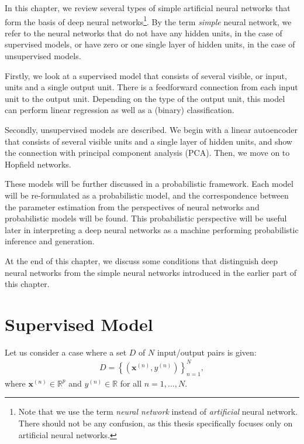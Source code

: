 \documentclass[dissertation,nocontribution]{aaltoseries}
\newcommand{\vect}[1]{\mathbf{#1}}
\newcommand{\vx}[0]{\vect{x}}
\newcommand{\RR}[0]{\mathbb{R}}
\begin{document}
In this chapter, we review several types of simple
artificial neural networks that form the basis of deep
neural networks\footnote{Note that we use the term
\textit{neural network} instead of \textit{artificial}
neural network.  There should not be any confusion, as this
thesis specifically focuses only on artificial neural
networks.}. By the term \textit{simple} neural network, we
refer to the neural networks that do not have any hidden
units, in the case of supervised models, or have zero or one
single layer of hidden units, in the case of unsupervised
models.

Firstly, we look at a supervised model that consists of
several visible, or input, units and a single output
unit. There is a feedforward connection from each input unit to
the output unit.  Depending on the type of the output unit,
this model can perform linear regression as well as a
(binary) classification.

Secondly, unsupervised models are described. We begin with a
linear autoencoder that consists of several visible units
and a single layer of hidden units, and show the connection
with principal component analysis (PCA). Then, we move on to
Hopfield networks.

These models will be further discussed in a probabilistic
framework.  Each model will be re-formulated as a
probabilistic model, and the correspondence between the
parameter estimation from the perspectives of neural
networks and probabilistic models will be found. This
probabilistic perspective will be useful later in
interpreting a deep neural networks as a machine
performing probabilistic inference and generation.

At the end of this chapter, we 
discuss some conditions
that distinguish deep neural networks from the simple neural
networks introduced in the earlier part of this chapter.

\section{Supervised Model}
\label{sec:supervised_model}

Let us consider a case where a set $D$ of $N$ input/output
pairs is given:
\begin{align}
    \label{eq:set_disc}
D=\left\{ \left( \vx^{(n)}, y^{(n)}
\right) \right\}_{n=1}^N,
\end{align}
where $\vx^{(n)} \in \RR^p$ and $y^{(n)} \in \RR$ for all
$n=1,\dots,N$.
\end{document}
